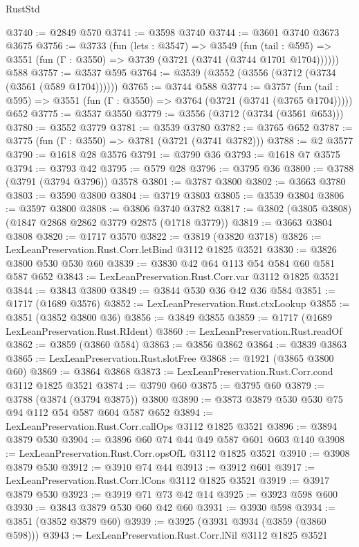 \begin{lexlean}{RustStd}
\begin{coremodule}
@3740 := @2849 @570
@3741 := @3598 @3740
@3744 := @3601 @3740 @3673 @3675
@3756 := @3733
    (fun (lets : @3547) =>
    @3549
      (fun (tail : @595) => @3551 (fun (Γ : @3550) => @3739 (@3721 (@3741 (@3744 @1701 @1704))))))
    @588
@3757 := @3537 @595
@3764 := @3539 (@3552 (@3556 (@3712 (@3734 (@3561 (@589 @1704))))))
@3765 := @3744 @588
@3774 := @3757
    (fun (tail : @595) => @3551 (fun (Γ : @3550) => @3764 (@3721 (@3741 (@3765 @1704)))))
    @652
@3775 := @3537 @3550
@3779 := @3556 (@3712 (@3734 (@3561 @653)))
@3780 := @3552 @3779
@3781 := @3539 @3780
@3782 := @3765 @652
@3787 := @3775 (fun (Γ : @3550) => @3781 (@3721 (@3741 @3782)))
@3788 := @2 @3577
@3790 := @1618 @28 @3576
@3791 := @3790 @36
@3793 := @1618 @7 @3575
@3794 := @3793 @42
@3795 := @579 @28
@3796 := @3795 @36
@3800 := @3788 (@3791 (@3794 @3796)) @3578
@3801 := @3787 @3800
@3802 := @3663 @3780
@3803 := @3590 @3800
@3804 := @3719 @3803
@3805 := @3539 @3804
@3806 := @3597 @3800
@3808 := @3806 @3740 @3782
@3817 := @3802 (@3805 @3808) (@1847 @2868 @2862 @3779 @2875 (@1718 @3779))
@3819 := @3663 @3804 @3808
@3820 := @1717 @3570
@3822 := @3819 (@3820 @3718)
@3826 := LexLeanPreservation.Rust.Corr.letBind @3112 @1825 @3521
@3830 := @3826 @3800 @530 @530 @60
@3839 := @3830 @42 @64 @113 @54 @584 @60 @581 @587 @652
@3843 := LexLeanPreservation.Rust.Corr.var @3112 @1825 @3521
@3844 := @3843 @3800
@3849 := @3844 @530 @36 @42 @36 @584
@3851 := @1717 (@1689 @3576)
@3852 := LexLeanPreservation.Rust.ctxLookup
@3855 := @3851 (@3852 @3800 @36)
@3856 := @3849 @3855
@3859 := @1717 (@1689 LexLeanPreservation.Rust.RIdent)
@3860 := LexLeanPreservation.Rust.readOf
@3862 := @3859 (@3860 @584)
@3863 := @3856 @3862
@3864 := @3839 @3863
@3865 := LexLeanPreservation.Rust.slotFree
@3868 := @1921 (@3865 @3800 @60)
@3869 := @3864 @3868
@3873 := LexLeanPreservation.Rust.Corr.cond @3112 @1825 @3521
@3874 := @3790 @60
@3875 := @3795 @60
@3879 := @3788 (@3874 (@3794 @3875)) @3800
@3890 := @3873 @3879 @530 @530 @75 @94 @112 @54 @587 @604 @587 @652
@3894 := LexLeanPreservation.Rust.Corr.callOps @3112 @1825 @3521
@3896 := @3894 @3879 @530
@3904 := @3896 @60 @74 @44 @49 @587 @601 @603 @140
@3908 := LexLeanPreservation.Rust.Corr.opsOfL @3112 @1825 @3521
@3910 := @3908 @3879 @530
@3912 := @3910 @74 @44
@3913 := @3912 @601
@3917 := LexLeanPreservation.Rust.Corr.lCons @3112 @1825 @3521
@3919 := @3917 @3879 @530
@3923 := @3919 @71 @73 @42 @14
@3925 := @3923 @598 @600
@3930 := @3843 @3879 @530 @60 @42 @60
@3931 := @3930 @598
@3934 := @3851 (@3852 @3879 @60)
@3939 := @3925 (@3931 @3934 (@3859 (@3860 @598)))
@3943 := LexLeanPreservation.Rust.Corr.lNil @3112 @1825 @3521

\end{coremodule}
\end{lexlean}

